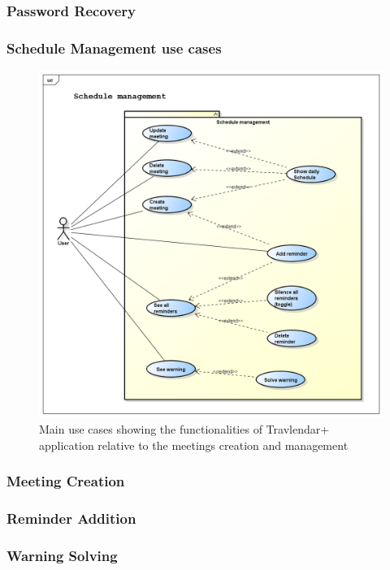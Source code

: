 \subsubsection{Password Recovery}



\newpage
\subsubsection{Schedule Management use cases}
\begin{figure}[htp] 
\includegraphics[width=\textwidth]{usecases/png/schedulemanagement} 
\caption{Main use cases showing the functionalities of Travlendar+ application relative to the meetings creation and management} 
\label{fig:schedulemanagement} 
\end{figure}

\newpage
\subsubsection{Meeting Creation}

\newpage
\subsubsection{Reminder Addition}

\newpage
\subsubsection{Warning Solving}



